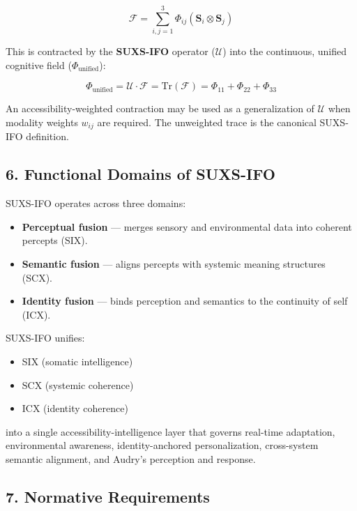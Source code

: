 \[
\mathcal{F}=\sum_{i,j=1}^{3}\Phi_{ij}(\mathbf{S}_i\otimes\mathbf{S}_j)
\]

This is contracted by the \textbf{SUXS-IFO} operator (\(\mathcal{U}\)) into the continuous, unified cognitive field (\(\Phi_{\mathrm{unified}}\)):

\[
\Phi_{\mathrm{unified}}=\mathcal{U}\cdot\mathcal{F}=\mathrm{Tr}(\mathcal{F})=\Phi_{11}+\Phi_{22}+\Phi_{33}
\]

An accessibility-weighted contraction may be used as a generalization of \(\mathcal{U}\) when modality weights \(w_{ij}\) are required. The unweighted trace is the canonical SUXS-IFO definition.

\subsection{6. Functional Domains of SUXS-IFO}\label{functional-domains-of-suxs-ifo}

SUXS-IFO operates across three domains:

\begin{itemize}
\tightlist
\item
  \textbf{Perceptual fusion} --- merges sensory and environmental data into coherent percepts (SIX).
\item
  \textbf{Semantic fusion} --- aligns percepts with systemic meaning structures (SCX).
\item
  \textbf{Identity fusion} --- binds perception and semantics to the continuity of self (ICX).
\end{itemize}

SUXS-IFO unifies:

\begin{itemize}
\tightlist
\item
  SIX (somatic intelligence)
\item
  SCX (systemic coherence)
\item
  ICX (identity coherence)
\end{itemize}

into a single accessibility-intelligence layer that governs real-time adaptation, environmental awareness, identity-anchored personalization, cross-system semantic alignment, and Audry's perception and response.

\subsection{7. Normative Requirements}\label{normative-requirements}

